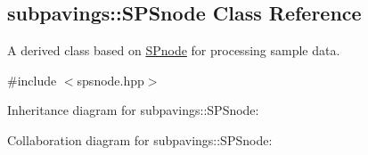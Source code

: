 \hypertarget{classsubpavings_1_1SPSnode}{\subsection{subpavings\-:\-:\-S\-P\-Snode \-Class \-Reference}
\label{classsubpavings_1_1SPSnode}
}


\-A derived class based on \hyperlink{classsubpavings_1_1SPnode}{\-S\-Pnode} for processing sample data.  




{\ttfamily \#include $<$spsnode.\-hpp$>$}



\-Inheritance diagram for subpavings\-:\-:\-S\-P\-Snode\-:


\-Collaboration diagram for subpavings\-:\-:\-S\-P\-Snode\-:
